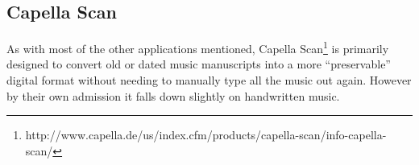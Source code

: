 \subsection{Capella Scan}
As with most of the other applications mentioned, Capella Scan\footnote{http://www.capella.de/us/index.cfm/products/capella-scan/info-capella-scan/} is primarily designed to convert old or dated music manuscripts into a more ``preservable'' digital format without needing to manually type all the music out again. However by their own admission it falls down slightly on handwritten music.